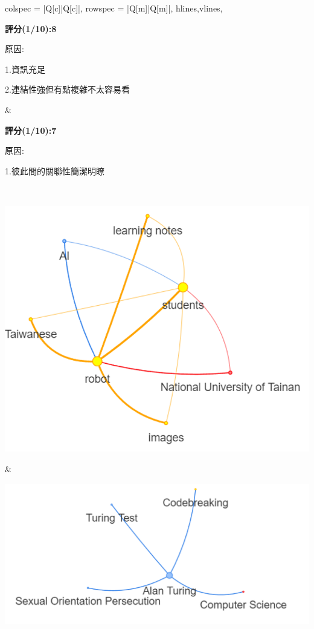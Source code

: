 \begin{longtblr}[
    caption = {臺南大學AI機器人場域驗證影片和艾倫圖靈的故事文本內容及知識圖},
]{
    colspec = {|Q[c]|Q[c]|},
    rowspec = {|Q[m]|Q[m]|},
    hlines,vlines,
}
\begin{minipage}[t]{0.4\textwidth}
            \centering
            \small \textbf{評分(1/10):8} \\
            \raggedright
            \small 原因: \par 1.資訊充足\par 2.連結性強但有點複雜不太容易看
            \vspace{5pt}
\end{minipage}  &  
\begin{minipage}[t]{0.4\textwidth}
            \centering
            \small \textbf{評分(1/10):7} \\
            \raggedright
            \small 原因: \par 1.彼此間的關聯性簡潔明瞭
\end{minipage} \\
\begin{minipage}[t][5cm][b]{0.3\textwidth}
            \centering
            \includegraphics[width=\textwidth]{images/w2/w2_llama3_1.png}\\
            \setcounter{figure}{4}
            \captionsetup{font=scriptsize}
\end{minipage}  &  
\begin{minipage}[t][5cm][b]{0.4\textwidth}
            \centering
            \includegraphics[width=\textwidth]{images/w2/w2_llama3_2.png}\\

\end{minipage}
\end{longtblr}
